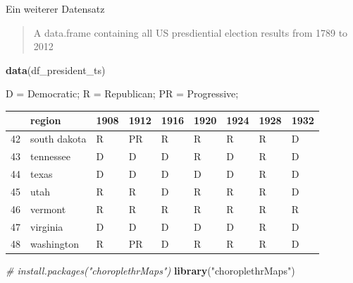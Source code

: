 \documentclass[ignorenonframetext,]{beamer}
\newenvironment{Shaded}{\begin{snugshade}}{\end{snugshade}}
\newcommand{\CommentTok}[1]{\textcolor[rgb]{0.56,0.35,0.01}{\textit{#1}}}
\newcommand{\KeywordTok}[1]{\textcolor[rgb]{0.13,0.29,0.53}{\textbf{#1}}}
\newcommand{\NormalTok}[1]{#1}
\newcommand{\StringTok}[1]{\textcolor[rgb]{0.31,0.60,0.02}{#1}}
\begin{document}
\begin{frame}[fragile]{Ein weiterer Datensatz}
\protect\hypertarget{ein-weiterer-datensatz}{}

\begin{quote}
A data.frame containing all US presdiential election results from 1789
to 2012
\end{quote}

\begin{Shaded}
\begin{Highlighting}[]
\KeywordTok{data}\NormalTok{(df_president_ts)}
\end{Highlighting}
\end{Shaded}

D = Democratic; R = Republican; PR = Progressive;

\begin{longtable}[]{@{}lllllllll@{}}
\toprule
& region & 1908 & 1912 & 1916 & 1920 & 1924 & 1928 & 1932\tabularnewline
\midrule
\endhead
42 & south dakota & R & PR & R & R & R & R & D\tabularnewline
43 & tennessee & D & D & D & R & D & R & D\tabularnewline
44 & texas & D & D & D & D & D & R & D\tabularnewline
45 & utah & R & R & D & R & R & R & D\tabularnewline
46 & vermont & R & R & R & R & R & R & R\tabularnewline
47 & virginia & D & D & D & D & D & R & D\tabularnewline
48 & washington & R & PR & D & R & R & R & D\tabularnewline
\bottomrule
\end{longtable}

\begin{Shaded}
\begin{Highlighting}[]
\CommentTok{# install.packages("choroplethrMaps")}
\KeywordTok{library}\NormalTok{(}\StringTok{"choroplethrMaps"}\NormalTok{)}
\end{Highlighting}
\end{Shaded}

\end{frame}
\end{document}
